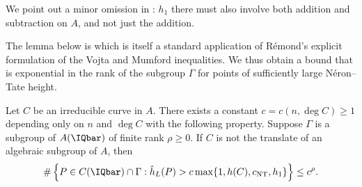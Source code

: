 We point out a minor omission in \cite[$\mathsection$2]{DGH1p}: $h_1$
there must also involve both addition and subtraction on $A$, and not just
the addition.

The lemma below is \cite[Corollary~2.3]{DGH1p} which is itself a
standard application of R\'emond's explicit formulation of the Vojta
and Mumford inequalities. We thus obtain a bound that is exponential in the
rank of the subgroup $\Gamma$ for points of sufficiently large
N\'eron--Tate height.

\begin{lemma}
\notready
  \label{lem:vojtamumford}
  Let $C$ be an irreducible curve in $A$.
There exists a constant $c=c(n,\deg C)\ge 1$ depending
only on $n$ and $\deg C$ with the following property. Suppose $\Gamma$
is a subgroup of $A(\IQbar)$ of finite rank $\rho\ge 0$. If $C$ is not
the translate of an algebraic subgroup of $A$, then
\begin{equation*}
\# \left \{P \in C(\IQbar)\cap \Gamma : \hat h_{L}(P) >
c\max\{1,h(C),c_{\mathrm{NT}},h_1\} \right\} \le c^\rho.
\end{equation*}
\end{lemma}

